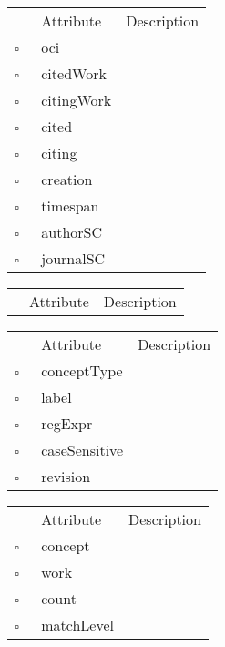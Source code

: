 \begin{table}
\caption{Citation  }

\begin{longtable}{llp{8cm}}
& Attribute & Description \\
$\square$\ & oci &  \\
$\square$\ & citedWork &  \\
$\square$\ & citingWork &  \\
$\square$\ & cited &  \\
$\square$\ & citing &  \\
$\square$\ & creation &  \\
$\square$\ & timespan &  \\
$\square$\ & authorSC &  \\
$\square$\ & journalSC &  \\
\end{longtable}
\label{attr:Citation}
\end{table}

\begin{table}
\caption{Collection  }

\begin{longtable}{llp{8cm}}
& Attribute & Description \\
\end{longtable}
\label{attr:Collection}
\end{table}

\clearpage
\begin{table}
\caption{Concept  }

\begin{longtable}{llp{8cm}}
& Attribute & Description \\
$\square$\ & conceptType &  \\
$\square$\ & label &  \\
$\square$\ & regExpr &  \\
$\square$\ & caseSensitive &  \\
$\square$\ & revision &  \\
\end{longtable}
\label{attr:Concept}
\end{table}

\begin{table}
\caption{ConceptWork  }

\begin{longtable}{llp{8cm}}
& Attribute & Description \\
$\square$\ & concept &  \\
$\square$\ & work &  \\
$\square$\ & count &  \\
$\square$\ & matchLevel &  \\
\end{longtable}
\label{attr:ConceptWork}
\end{table}

